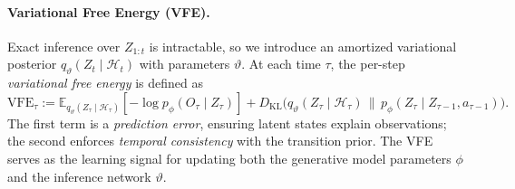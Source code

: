 \documentclass{article} %
\begin{document}
\paragraph{Variational Free Energy (VFE).}
Exact inference over $Z_{1:t}$ is intractable, so we introduce an amortized variational posterior 
$q_\vartheta(Z_t \mid \mathcal H_t)$ with parameters $\vartheta$.  
At each time $\tau$, the per-step \emph{variational free energy} is defined as
{\small\begin{equation}
\text{VFE}_\tau :=
\mathbb{E}_{q_\vartheta(Z_\tau\mid\mathcal H_\tau)}[-\log p_\phi(O_\tau\mid Z_\tau)]
+ D_{\mathrm{KL}}\!\big(q_\vartheta(Z_\tau\mid \mathcal H_\tau)\,\|\,p_\phi(Z_\tau\mid Z_{\tau-1},a_{\tau-1})\big).
\label{eq:per_step_VFE}
\end{equation}}
The first term is a \emph{prediction error}, ensuring latent states explain observations;  
the second enforces \emph{temporal consistency} with the transition prior.  
The VFE serves as the learning signal for updating both the generative model parameters $\phi$ and the inference network $\vartheta$.  
\end{document}

